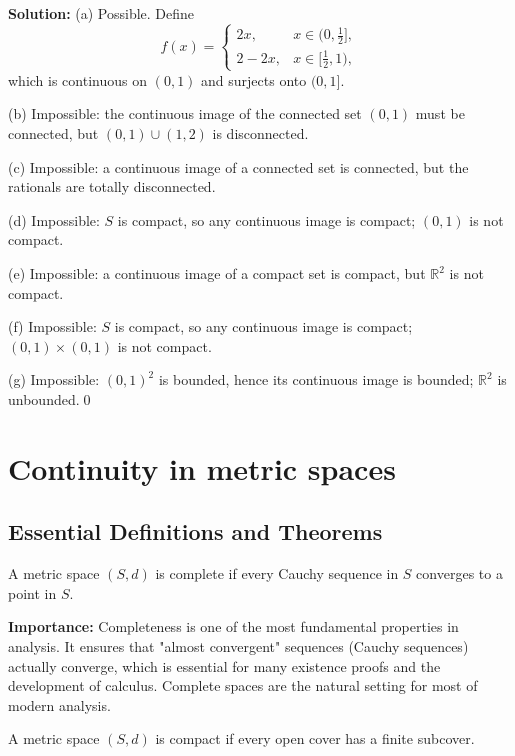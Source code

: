 \bigskip\noindent\textbf{Solution:}
(a) Possible. Define
\[
f(x)=\begin{cases}
2x,& x\in(0,\tfrac12],\\
2-2x,& x\in[\tfrac12,1),
\end{cases}
\]
which is continuous on $(0,1)$ and surjects onto $(0,1]$.

(b) Impossible: the continuous image of the connected set $(0,1)$ must be connected, but $(0,1)\cup(1,2)$ is disconnected.

(c) Impossible: a continuous image of a connected set is connected, but the rationals are totally disconnected.

(d) Impossible: $S$ is compact, so any continuous image is compact; $(0,1)$ is not compact.

(e) Impossible: a continuous image of a compact set is compact, but $\mathbb{R}^2$ is not compact.

(f) Impossible: $S$ is compact, so any continuous image is compact; $(0,1)\times(0,1)$ is not compact.

(g) Impossible: $(0,1)^2$ is bounded, hence its continuous image is bounded; $\mathbb{R}^2$ is unbounded.\qed

\section{Continuity in metric spaces}

\subsection*{Essential Definitions and Theorems}

\begin{definition}
A metric space $(S,d)$ is complete if every Cauchy sequence in $S$ converges to a point in $S$.
\end{definition}

\noindent\textbf{Importance:} Completeness is one of the most fundamental properties in analysis. It ensures that "almost convergent" sequences (Cauchy sequences) actually converge, which is essential for many existence proofs and the development of calculus. Complete spaces are the natural setting for most of modern analysis.



\begin{definition}
A metric space $(S,d)$ is compact if every open cover has a finite subcover.
\end{definition}

